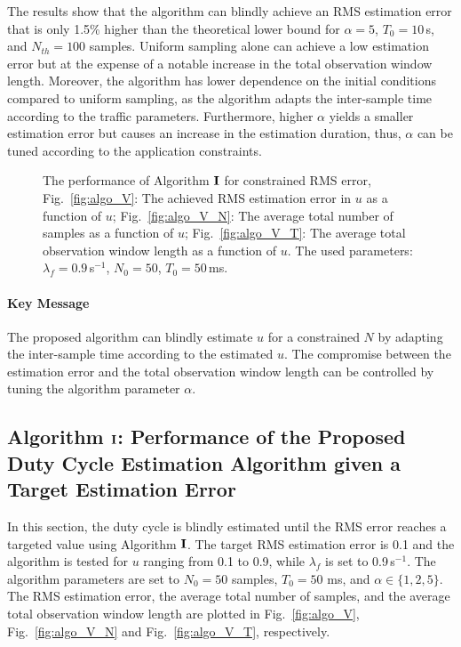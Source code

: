 \documentclass[11pt,draftclsnofoot,journal,onecolumn]{IEEEtran}
\begin{document}
The results show that the algorithm can blindly achieve an RMS estimation error that is only 1.5\% higher than the theoretical lower bound for $\alpha = 5$, $T_0 = 10$\,s, and $N_{th}=100$ samples. Uniform sampling alone can achieve a low estimation error but at the expense of a notable increase in the total observation window length. Moreover, the algorithm has lower dependence on the initial conditions compared to uniform sampling, as the algorithm adapts the inter-sample time according to the traffic parameters. Furthermore, higher $\alpha$ yields a smaller estimation error but causes an increase in the estimation duration, thus, $\alpha$ can be tuned according to the application constraints.

\begin{figure*}
\centering
{}
\caption{The performance of Algorithm $\bf{I}$ for constrained RMS error, Fig.~\ref{fig:algo_V}: The achieved RMS estimation error in $u$ as a function of $u$; Fig.~\ref{fig:algo_V_N}: The average total number of samples as a function of $u$; Fig.~\ref{fig:algo_V_T}: The average total observation window length as a function of $u$. The used parameters: $\lambda_f=0.9$\,s$^{-1}$, $N_0=50$, $T_0=50$\,ms.}
\end{figure*}

\paragraph*{Key Message}

The proposed algorithm can blindly estimate $u$ for a constrained $N$ by adapting the inter-sample time according to the estimated $u$. The compromise between the estimation error and the total observation window length can be controlled by tuning the algorithm parameter $\alpha$.

\subsection{Algorithm $\bf{I}$: Performance of the Proposed Duty Cycle Estimation Algorithm given a Target Estimation Error}
\label{sec:algorithm_numerical_cons_V}

In this section, the duty cycle is blindly estimated until the RMS error reaches a targeted value using Algorithm $\bf{I}$. The target RMS estimation error is 0.1 and the algorithm is tested for $u$ ranging from 0.1 to 0.9, while $\lambda_f$ is set to 0.9\,s$^{-1}$. The algorithm parameters are set to $N_0=50$ samples, $T_0=50$ ms, and $\alpha\in\{1,2,5\}$. The RMS estimation error, the average total number of samples, and the average total observation window length are plotted in Fig.~\ref{fig:algo_V}, Fig.~\ref{fig:algo_V_N} and Fig.~\ref{fig:algo_V_T}, respectively.
\end{document}
